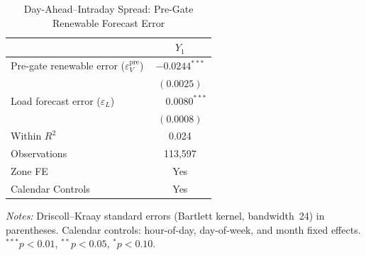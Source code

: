 \begin{table}[htbp]
\centering
\caption{Day-Ahead--Intraday Spread: Pre-Gate Renewable Forecast Error}
\label{tab:2}
\begin{threeparttable}
\begin{tabularx}{\linewidth}{>{\raggedright\arraybackslash}Xc}
\toprule
 & $Y_1$ \\
\midrule
Pre-gate renewable error ($\varepsilon_V^{\mathrm{pre}}$) & $-0.0244^{***}$ \\
 & $(0.0025)$ \\[0.4ex]
Load forecast error ($\varepsilon_L$) & $\phantom{-}0.0080^{***}$ \\
 & $(0.0008)$ \\
\midrule
Within $R^2$ & 0.024 \\
Observations & 113,597 \\
Zone FE & Yes \\
Calendar Controls & Yes \\
\bottomrule
\end{tabularx}
\begin{tablenotes}[flushleft]
\footnotesize
\item \textit{Notes:} Driscoll--Kraay standard errors (Bartlett kernel, bandwidth~24) in parentheses. Calendar controls: hour-of-day, day-of-week, and month fixed effects. $^{***}p<0.01$, $^{**}p<0.05$, $^{*}p<0.10$.
\end{tablenotes}
\end{threeparttable}
\end{table}

